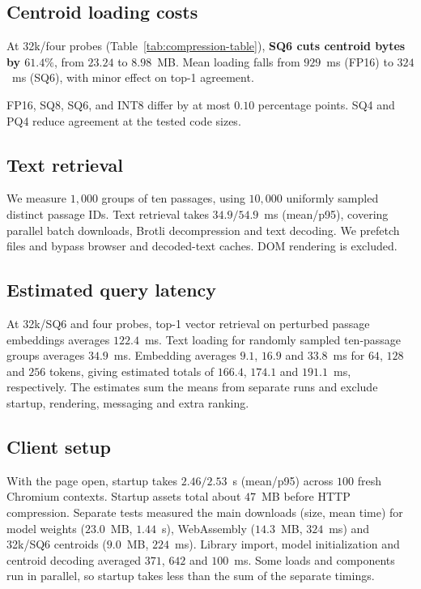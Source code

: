 \documentclass[sigconf, screen, review, balance=false]{acmart}
\begin{document}
\subsection{Centroid loading costs}
At 32k/four probes (Table~\ref{tab:compression-table}), \textbf{SQ6 cuts centroid bytes by $61.4\%$}, from $23.24$ to $8.98$~MB. Mean loading falls from $929$~ms (FP16) to $324$~ms (SQ6), with minor effect on top-1 agreement.



FP16, SQ8, SQ6, and INT8 differ by at most $0.10$ percentage points. SQ4 and PQ4 reduce agreement at the tested code sizes.

\subsection{Text retrieval}
\label{sec:text-retrieval}
We measure $1{,}000$ groups of ten passages, using $10{,}000$ uniformly sampled distinct passage IDs. Text retrieval takes $34.9/54.9$~ms (mean/p95), covering parallel batch downloads, Brotli decompression and text decoding. We prefetch files and bypass browser and decoded-text caches. DOM rendering is excluded.

\subsection{Estimated query latency}
\label{sec:client-costs}
At 32k/SQ6 and four probes, top-1 vector retrieval on perturbed passage embeddings averages $122.4$~ms. Text loading for randomly sampled ten-passage groups averages $34.9$~ms. Embedding averages $9.1$, $16.9$ and $33.8$~ms for $64$, $128$ and $256$ tokens, giving estimated totals of $166.4$, $174.1$ and $191.1$~ms, respectively. The estimates sum the means from separate runs and exclude startup, rendering, messaging and extra ranking.

\subsection{Client setup}
\label{sec:client-setup}
With the page open, startup takes $2.46/2.53$~s (mean/p95) across $100$ fresh Chromium contexts. Startup assets total about $47$~MB before HTTP compression. Separate tests measured the main downloads (size, mean time) for model weights ($23.0$~MB, $1.44$~s), WebAssembly ($14.3$~MB, $324$~ms) and 32k/SQ6 centroids ($9.0$~MB, $224$~ms). Library import, model initialization and centroid decoding averaged $371$, $642$ and $100$~ms. Some loads and components run in parallel, so startup takes less than the sum of the separate timings.
\end{document}
